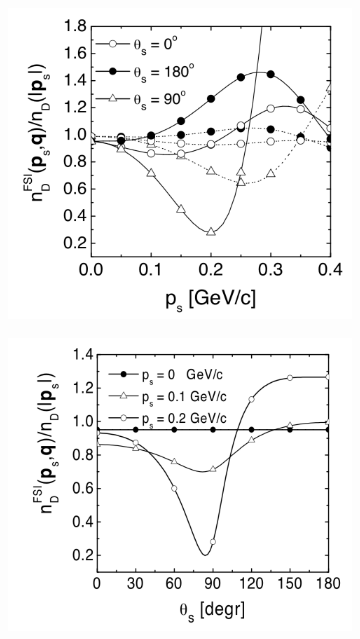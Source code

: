 \begin{figure}
	\centering
	\begin{subfigure}[b]{0.4\linewidth}
		\includegraphics[width=\linewidth]{figures/fsi_p.png}
		\caption{}
		\label{fig:fsi_p}
	\end{subfigure}
	\begin{subfigure}[b]{0.4\linewidth}
		\includegraphics[width=\linewidth]{figures/fsi_th.png}
		\caption{}
		\label{fig:fsi_th}

\end{subfigure}
\end{figure}
